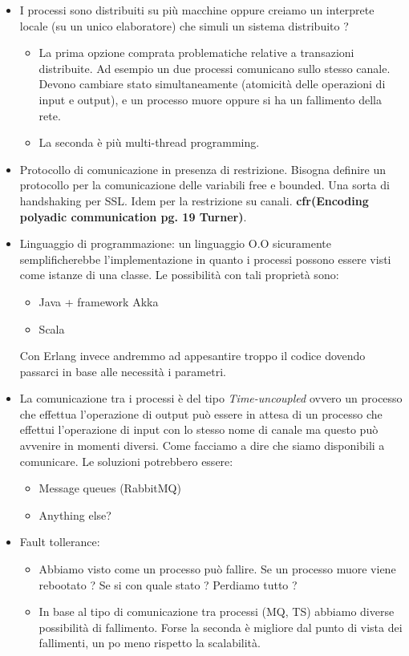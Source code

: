\documentclass{article}
\begin{document}
\begin{itemize}
\item I processi sono distribuiti su più macchine oppure creiamo un interprete locale (su un unico elaboratore) che simuli un sistema distribuito ?
\begin{itemize}
	\item La prima opzione comprata  problematiche relative a transazioni distribuite. Ad esempio un due processi comunicano sullo stesso canale. Devono cambiare stato simultaneamente (atomicità delle operazioni di input e output), e un processo muore oppure si ha un fallimento della rete. 
	\item La seconda è pi\`u multi-thread programming.  
\end{itemize}

  
\item  Protocollo di comunicazione in presenza di restrizione. Bisogna definire un protocollo per la comunicazione delle variabili free e bounded. Una sorta di handshaking per SSL.
Idem per la restrizione su canali. \textbf{cfr(Encoding polyadic communication pg. 19 Turner)}. 

\item Linguaggio di programmazione: un linguaggio O.O sicuramente semplificherebbe l'implementazione in quanto i processi possono essere visti come istanze di una classe. Le possibilità con tali proprietà sono:
\begin{itemize}
	\item Java + framework Akka
	\item Scala 
\end{itemize}
Con Erlang invece andremmo ad appesantire troppo il codice dovendo passarci in base alle necessità i parametri.
  
  
  \item La comunicazione tra i processi è del tipo \emph{Time-uncoupled} ovvero un processo che effettua l'operazione di output può essere in attesa di un processo che effettui l'operazione di input con lo stesso nome di canale ma questo può avvenire in momenti diversi. Come facciamo a dire che siamo disponibili a comunicare. Le soluzioni potrebbero essere: 
  \begin{itemize}
  	\item Message queues (RabbitMQ)
  	\item Anything else? 
  \end{itemize}

\item Fault tollerance:
\begin{itemize}
\item Abbiamo visto come un processo può fallire. Se un processo muore viene rebootato ? Se si con quale stato ? Perdiamo tutto ?


\item In base al tipo di comunicazione tra processi (MQ, TS) abbiamo diverse possibilità di fallimento. Forse la seconda è migliore dal punto di vista dei fallimenti, un po meno rispetto la scalabilità.


 \end{itemize}

\end{itemize}

%
\end{document}
